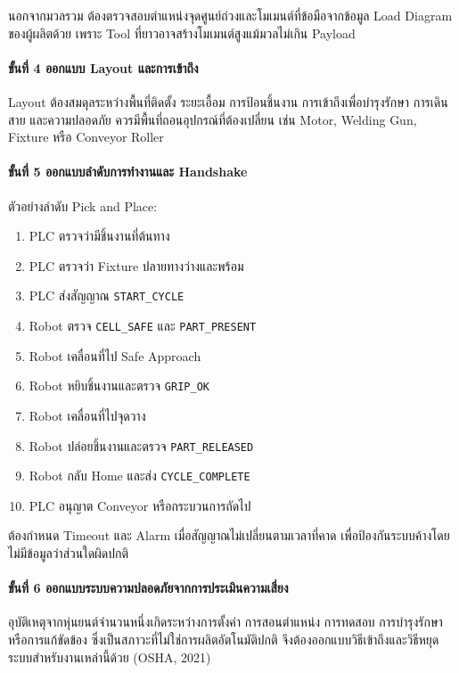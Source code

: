 นอกจากมวลรวม ต้องตรวจสอบตำแหน่งจุดศูนย์ถ่วงและโมเมนต์ที่ข้อมือจากข้อมูล Load Diagram ของผู้ผลิตด้วย เพราะ Tool ที่ยาวอาจสร้างโมเมนต์สูงแม้มวลไม่เกิน Payload

\paragraph{ขั้นที่ 4 ออกแบบ Layout และการเข้าถึง}

Layout ต้องสมดุลระหว่างพื้นที่ติดตั้ง ระยะเอื้อม การป้อนชิ้นงาน การเข้าถึงเพื่อบำรุงรักษา การเดินสาย และความปลอดภัย ควรมีพื้นที่ถอนอุปกรณ์ที่ต้องเปลี่ยน เช่น Motor, Welding Gun, Fixture หรือ Conveyor Roller

\paragraph{ขั้นที่ 5 ออกแบบลำดับการทำงานและ Handshake}

ตัวอย่างลำดับ Pick and Place:

\begin{enumerate}
    \item PLC ตรวจว่ามีชิ้นงานที่ต้นทาง
    \item PLC ตรวจว่า Fixture ปลายทางว่างและพร้อม
    \item PLC ส่งสัญญาณ \texttt{START\_CYCLE}
    \item Robot ตรวจ \texttt{CELL\_SAFE} และ \texttt{PART\_PRESENT}
    \item Robot เคลื่อนที่ไป Safe Approach
    \item Robot หยิบชิ้นงานและตรวจ \texttt{GRIP\_OK}
    \item Robot เคลื่อนที่ไปจุดวาง
    \item Robot ปล่อยชิ้นงานและตรวจ \texttt{PART\_RELEASED}
    \item Robot กลับ Home และส่ง \texttt{CYCLE\_COMPLETE}
    \item PLC อนุญาต Conveyor หรือกระบวนการถัดไป
\end{enumerate}

ต้องกำหนด Timeout และ Alarm เมื่อสัญญาณไม่เปลี่ยนตามเวลาที่คาด เพื่อป้องกันระบบค้างโดยไม่มีข้อมูลว่าส่วนใดผิดปกติ

\paragraph{ขั้นที่ 6 ออกแบบระบบความปลอดภัยจากการประเมินความเสี่ยง}

อุบัติเหตุจากหุ่นยนต์จำนวนหนึ่งเกิดระหว่างการตั้งค่า การสอนตำแหน่ง การทดสอบ การบำรุงรักษา หรือการแก้ขัดข้อง ซึ่งเป็นสภาวะที่ไม่ใช่การผลิตอัตโนมัติปกติ จึงต้องออกแบบวิธีเข้าถึงและวิธีหยุดระบบสำหรับงานเหล่านี้ด้วย (OSHA, 2021)

